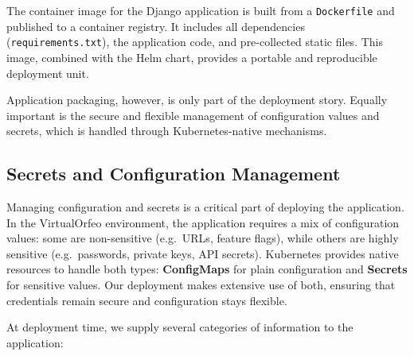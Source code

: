\medskip

The container image for the Django application is built from a \texttt{Dockerfile} 
and published to a container registry. It includes all dependencies 
(\texttt{requirements.txt}), the application code, and pre-collected static 
files. This image, combined with the Helm chart, provides a portable and 
reproducible deployment unit.

\medskip
\noindent Application packaging, however, is only part of the deployment story. 
Equally important is the secure and flexible management of configuration values 
and secrets, which is handled through Kubernetes-native mechanisms.


\subsection{Secrets and Configuration Management}

Managing configuration and secrets is a critical part of deploying the application. In the VirtualOrfeo environment, the application requires a mix of configuration values: some are non-sensitive (e.g.\ URLs, feature flags), while others are highly sensitive (e.g.\ passwords, private keys, API secrets). Kubernetes provides native resources to handle both types: \textbf{ConfigMaps} for plain configuration and \textbf{Secrets} for sensitive values. Our deployment makes extensive use of both, ensuring that credentials remain secure and configuration stays flexible.

\medskip

At deployment time, we supply several categories of information to the application:

